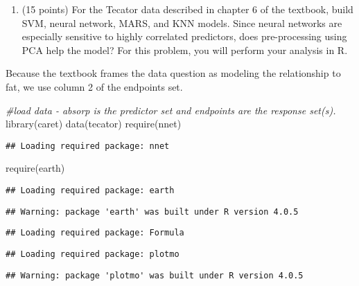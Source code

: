 \documentclass[
]{article}
\newenvironment{Shaded}{\begin{snugshade}}{\end{snugshade}}
\newcommand{\CommentTok}[1]{\textcolor[rgb]{0.56,0.35,0.01}{\textit{#1}}}
\newcommand{\FunctionTok}[1]{\textcolor[rgb]{0.00,0.00,0.00}{#1}}
\newcommand{\NormalTok}[1]{#1}
\providecommand{\tightlist}{%
  \setlength{\itemsep}{0pt}\setlength{\parskip}{0pt}}
\begin{document}
\begin{enumerate}
\def\labelenumi{\arabic{enumi}.}
\setcounter{enumi}{1}
\tightlist
\item
  (15 points) For the Tecator data described in chapter 6 of the
  textbook, build SVM, neural network, MARS, and KNN models. Since
  neural networks are especially sensitive to highly correlated
  predictors, does pre-processing using PCA help the model? For this
  problem, you will perform your analysis in R.
\end{enumerate}

Because the textbook frames the data question as modeling the
relationship to fat, we use column 2 of the endpoints set.

\begin{Shaded}
\begin{Highlighting}[]
\CommentTok{\#load data {-} absorp is the predictor set and endpoints are the response set(s).}
\FunctionTok{library}\NormalTok{(caret)}
\FunctionTok{data}\NormalTok{(tecator)}
\FunctionTok{require}\NormalTok{(nnet)}
\end{Highlighting}
\end{Shaded}

\begin{verbatim}
## Loading required package: nnet
\end{verbatim}

\begin{Shaded}
\begin{Highlighting}[]
\FunctionTok{require}\NormalTok{(earth)}
\end{Highlighting}
\end{Shaded}

\begin{verbatim}
## Loading required package: earth
\end{verbatim}

\begin{verbatim}
## Warning: package 'earth' was built under R version 4.0.5
\end{verbatim}

\begin{verbatim}
## Loading required package: Formula
\end{verbatim}

\begin{verbatim}
## Loading required package: plotmo
\end{verbatim}

\begin{verbatim}
## Warning: package 'plotmo' was built under R version 4.0.5
\end{verbatim}
\end{document}
